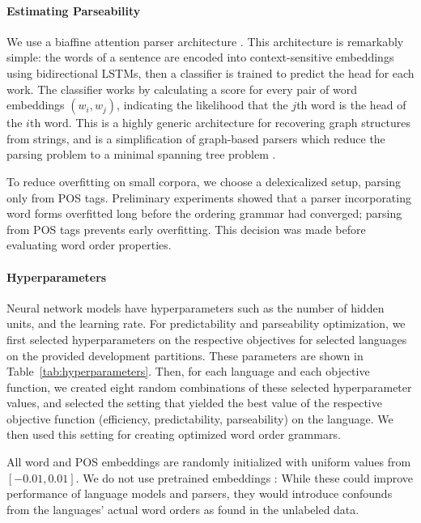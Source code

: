 \documentclass[10pt,twoside,lineno]{article}
\begin{document}
\paragraph{Estimating Parseability}
We use a biaffine attention parser architecture \citep{kiperwasser2016simple,zhang2017dependency,dozat2017stanford}. This architecture is remarkably simple: the words of a sentence are encoded into context-sensitive embeddings using bidirectional LSTMs, then a classifier is trained to predict the head for each work. The classifier works by calculating a score for every pair of word embeddings $(w_i, w_j)$, indicating the likelihood that the $j$th word is the head of the $i$th word. This is a highly generic architecture for recovering graph structures from strings, and is a simplification of graph-based parsers which reduce the parsing problem to a minimal spanning tree problem \citep{mcdonald2005nonprojective}.

To reduce overfitting on small corpora, we choose a delexicalized setup, parsing only from POS tags. Preliminary experiments showed that a parser incorporating word forms overfitted long before the ordering grammar had converged; parsing from POS tags prevents early overfitting.
This decision was made before evaluating word order properties.

\paragraph{Hyperparameters}


Neural network models have hyperparameters such as the number of hidden units, and the learning rate. 
For predictability and parseability optimization, we first selected hyperparameters on the respective objectives for selected languages on the provided development partitions.
These parameters are shown in Table~\ref{tab:hyperparameters}.
Then, for each language and each objective function, we created eight random combinations of these selected hyperparameter values, and selected the setting that yielded the best value of the respective objective function (efficiency, predictability, parseability) on the language. We then used this setting for creating optimized word order grammars. 




All word and POS embeddings are randomly initialized with uniform values from $[-0.01, 0.01]$.
We do not use pretrained embeddings \citep{peters2018deep}: While these could improve performance of language models and parsers, they would introduce confounds from the languages' actual word orders as found in the unlabeled data.
\end{document}
